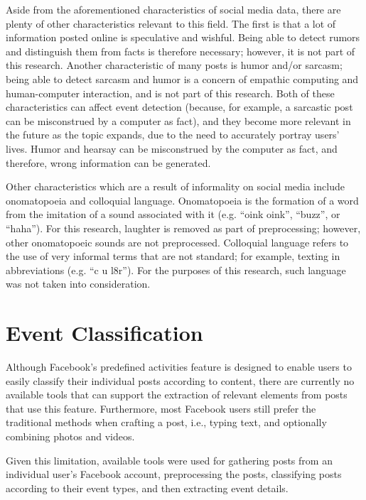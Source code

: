 Aside from the aforementioned characteristics of social media data, there are plenty of other characteristics relevant to this field. The first is that a lot of information posted online is speculative and wishful. Being able to detect rumors and distinguish them from facts is therefore necessary; however, it is not part of this research. Another characteristic of many posts is humor and/or sarcasm; being able to detect sarcasm and humor is a concern of empathic computing and human-computer interaction, and is not part of this research. Both of these characteristics can affect event detection (because, for example, a sarcastic post can be misconstrued by a computer as fact), and they become more relevant in the future as the topic expands, due to the need to accurately portray users' lives. Humor and hearsay can be misconstrued by the computer as fact, and therefore, wrong information can be generated.

Other characteristics which are a result of informality on social media include onomatopoeia and colloquial language. Onomatopoeia is the formation of a word from the imitation of a sound associated with it (e.g. ``oink oink”, ``buzz”, or ``haha”). For this research, laughter is removed as part of preprocessing; however, other onomatopoeic sounds are not preprocessed. Colloquial language refers to the use of very informal terms that are not standard; for example, texting in abbreviations (e.g. ``c u l8r”). For the purposes of this research, such language was not taken into consideration.


\section{Event Classification}
Although Facebook's predefined activities feature is designed to enable users to easily classify their individual posts according to content, there are currently no available tools that can support the extraction of relevant elements from posts that use this feature. Furthermore, most Facebook users still prefer the traditional methods when crafting a post, i.e., typing text, and optionally combining photos and videos.

Given this limitation, available tools were used for gathering posts from an individual user's Facebook account, preprocessing the posts, classifying posts according to their event types, and then extracting event details.

